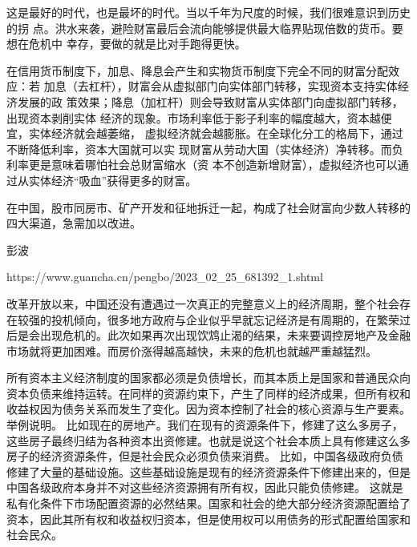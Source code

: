 这是最好的时代，也是最坏的时代。当以千年为尺度的时候，我们很难意识到历史的拐
点。洪水来袭，避险财富最后会流向能够提供最大临界贴现倍数的货币。要想在危机中
幸存，要做的就是比对手跑得更快。

在信用货币制度下，加息、降息会产生和实物货币制度下完全不同的财富分配效应：若
加息（去杠杆），财富会从虚拟部门向实体部门转移，实现资本支持实体经济发展的政
策效果；降息（加杠杆）则会导致财富从实体部门向虚拟部门转移，出现资本剥削实体
经济的现象。市场利率低于影子利率的幅度越大，资本越便宜，实体经济就会越萎缩，
虚拟经济就会越膨胀。在全球化分工的格局下，通过不断降低利率，资本大国就可以实
现财富从劳动大国（实体经济）净转移。而负利率更是意味着哪怕社会总财富缩水（资
本不创造新增财富），虚拟经济也可以通过从实体经济“吸血”获得更多的财富。

在中国，股市同房市、矿产开发和征地拆迁一起，构成了社会财富向少数人转移的四大渠道，急需加以改进。




彭波

https://www.guancha.cn/pengbo/2023_02_25_681392_1.shtml

改革开放以来，中国还没有遭遇过一次真正的完整意义上的经济周期，整个社会存在较强的投机倾向，很多地方政府与企业似乎早就忘记经济是有周期的，在繁荣过后是会出现危机的。此次如果再次出现饮鸩止渴的结果，未来要调控房地产及金融市场就将更加困难。而房价涨得越高越快，未来的危机也就越严重越猛烈。


所有资本主义经济制度的国家都必须是负债增长，而其本质上是国家和普通民众向资本负债来维持运转。在同样的资源约束下，产生了同样的经济成果，但所有权和收益权因为债务关系而发生了变化。因为资本控制了社会的核心资源与生产要素。
举例说明。
比如现在的房地产。我们在现有的资源条件下，修建了这么多房子，这些房子最终归结为各种资本出资修建。也就是说这个社会本质上具有修建这么多房子的经济资源条件，但是社会民众必须负债来消费。
比如，中国各级政府负债修建了大量的基础设施。这些基础设施是现有的经济资源条件下修建出来的，但是中国各级政府本身并不对这些经济资源拥有所有权，因此只能负债修建。
这就是私有化条件下市场配置资源的必然结果。国家和社会的绝大部分经济资源配置给了资本，因此其所有权和收益权归资本，但是使用权可以用债务的形式配置给国家和社会民众。


